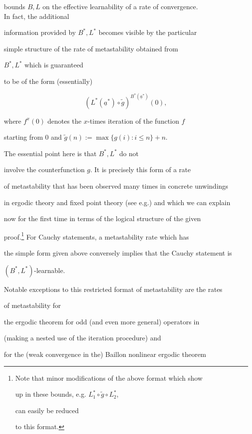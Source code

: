 \documentclass[1p]{elsarticle}
\theoremstyle{plain}
\theoremstyle{definition}
\theoremstyle{remark}
\theoremstyle{definition}
\begin{document}
bounds $B,L$ on the effective learnability of a rate of convergence.\\ 

In fact, the additional 

information provided by $B^*,L^*$ becomes visible by the particular 

simple structure of the rate of metastability obtained from 

$B^*,L^*$ which is guaranteed 

to be of the form (essentially) 

\[ (L^*(\underline{a}^*)\circ \tilde{g})^{B^*(\underline{a}^*)}(0), \] 

where $f^{x}(0)$ denotes the $x$-times iteration of the function $f$ 

starting from $0$ and $\tilde{g}(n):=\max\{ g(i):i\le n\}+n.$ 

The essential point here is that $B^*,L^*$ do not 

involve the counterfunction $g.$ It is precisely this form of a rate 

of metastability that has been observed many times in concrete unwindings 

in ergodic theory and fixed point theory (see e.g.\cite{Avigad/Gerhardy/Towsner,Kohlenbach/Leustean4,Kohlenbach/Leustean3,Kohlenbach(Browder),Kohlenbach/Leustean6,Kohlenbach/Leustean7}) and which we can explain 

now for the first time in terms of the logical structure of the given 

proof.\footnote{Note that minor modifications of the above format which show 

up in these bounds, e.g. $L^*_1\circ \tilde{g}\circ L^*_2$, 

can easily be reduced 

to this format.} For Cauchy statements, a metastability rate which has 

the simple form given above conversely implies that the Cauchy statement is 

$(B^*,L^*)$-learnable. 

Notable exceptions to this restricted format of metastability are the rates 

of metastability for 

the ergodic theorem for odd (and even more general) operators in 

\cite{Safarik(11)} (making a nested use of the iteration procedure) and 

for the (weak convergence in the) Baillon nonlinear ergodic theorem 
\end{document}
